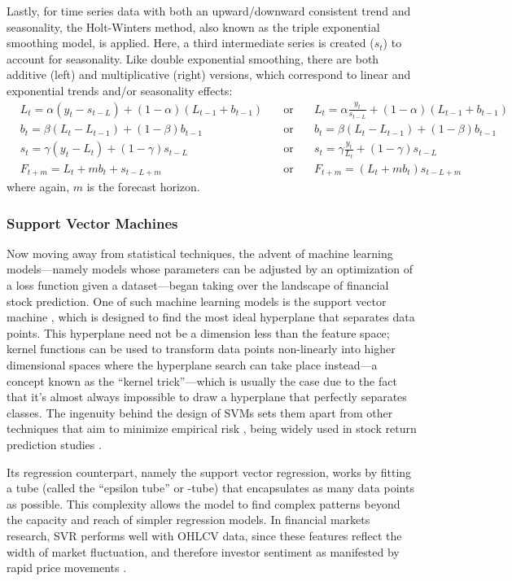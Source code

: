 \documentclass[stu,floatsintext]{apa7}
\begin{document}
Lastly, for time series data with both an upward/downward consistent trend and seasonality, the Holt-Winters method, also known as the triple exponential smoothing model, is applied. Here, a third intermediate series is created ($s_t$) to account for seasonality. Like double exponential smoothing, there are both additive (left) and multiplicative (right) versions, which correspond to linear and exponential trends and/or seasonality effects:
\begin{align}
&L_t = \alpha(y_t - s_{t-L}) + (1 - \alpha)(L_{t-1} + b_{t-1})\quad&\text{or}\quad&L_t = \alpha \frac{y_t}{s_{t-L}} + (1 - \alpha)(L_{t-1} + b_{t-1})\\
&b_t = \beta(L_t - L_{t-1}) + (1 - \beta)b_{t-1}\quad&\text{or}\quad&b_t = \beta(L_t - L_{t-1}) + (1 - \beta)b_{t-1}\\
&s_t = \gamma(y_t - L_t) + (1 - \gamma)s_{t-L}\quad&\text{or}\quad&s_t = \gamma \frac{y_t}{L_t} + (1 - \gamma)s_{t-L}\\
&F_{t+m} = L_t + mb_t + s_{t-L+m}\quad&\text{or}\quad&F_{t+m} = (L_t + mb_t) s_{t-L+m}
\end{align}
where again, $m$ is the forecast horizon.

\subsubsection{Support Vector Machines}

Now moving away from statistical techniques, the advent of machine learning models—namely models whose parameters can be adjusted by an optimization of a loss function given a dataset—began taking over the landscape of financial stock prediction. One of such machine learning models is the support vector machine \parencite{cortes1995supportvector}, which is designed to find the most ideal hyperplane that separates data points. This hyperplane need not be a dimension less than the feature space; kernel functions can be used to transform data points non-linearly into higher dimensional spaces where the hyperplane search can take place instead—a concept known as the “kernel trick”—which is usually the case due to the fact that it’s almost always impossible to draw a hyperplane that perfectly separates classes. The ingenuity behind the design of SVMs sets them apart from other techniques that aim to minimize empirical risk \parencite{beniwal2025adaptive}, being widely used in stock return prediction studies \parencite{sable2019empirical}.

Its regression counterpart, namely the support vector regression, works by fitting a tube (called the “epsilon tube” or -tube) that encapsulates as many data points as possible. This complexity allows the model to find complex patterns beyond the capacity and reach of simpler regression models. In financial markets research, SVR performs well with OHLCV data, since these features reflect the width of market fluctuation, and therefore investor sentiment as manifested by rapid price movements \parencite{sable2019empirical}.
\end{document}
